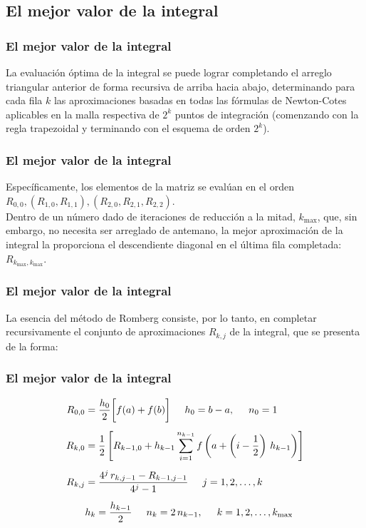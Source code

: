 \subsection*{El mejor valor de la integral}
\begin{frame}
\frametitle{El mejor valor de la integral}
La evaluación óptima de la integral se puede lograr completando el arreglo triangular anterior de forma recursiva de arriba hacia abajo, determinando para cada fila $k$ las aproximaciones basadas en todas las fórmulas de Newton-Cotes aplicables en la malla respectiva de $2^{k}$ puntos de integración (comenzando con la regla trapezoidal y terminando con el esquema de orden $2^{k}$).
\end{frame}
\begin{frame}
\frametitle{El mejor valor de la integral}
Específicamente, los elementos de la matriz se evalúan en el orden $R_{0, 0}, (R_{1, 0}, R_{1, 1}), (R_{2, 0}, R_{2, 1}, R_{2, 2})$.
\\
\bigskip
Dentro de un número dado de iteraciones de reducción a la mitad, $k_{\max}$, que, sin embargo, no necesita ser arreglado de antemano, la mejor aproximación de la integral la proporciona el descendiente diagonal en el última fila completada: $R_{k_{\max}, k_{\max}}$.
\end{frame}
\begin{frame}
\frametitle{El mejor valor de la integral}
La esencia del método de Romberg consiste, por lo tanto, en completar recursivamente el conjunto de aproximaciones $R_{k, j}$ de la integral, que se presenta de la forma:
\end{frame}
\begin{frame}
\frametitle{El mejor valor de la integral}
\begin{align}
R_{0, 0} &= \dfrac{h_{0}}{2} \bigg[ f(a) +  f(b) \bigg] \hspace{0.5cm} h_{0} = b - a, \hspace{0.5cm} n_{0} = 1 \label{eq:ecuacion_10_47} \\[0.5em]
R_{k, 0} &= \dfrac{1}{2} \left[ R_{k-1, 0} + h_{k-1} \sum_{i=1}^{n_{k-1}} f \left( a + \left( i - \dfrac{1}{2} \right) \, h_{k-1} \right) \right] \label{eq:ecuacion_10_48} \\[0.5em]
R_{k, j} &= \dfrac{4^{j} \, r_{k, j-1} - R_{k-1, j-1}}{4^j - 1} \hspace{0.5cm} j = 1, 2, \ldots, k \label{eq:ecuacion_10_49} \\[0.5em]
&h_{k} = \dfrac{h_{k-1}}{2} \hspace{0.5cm} n_{k} = 2 \, n_{k-1}, \hspace{0.5cm} k = 1, 2, \ldots, k_{\max} \nonumber
\end{align}
\end{frame}

